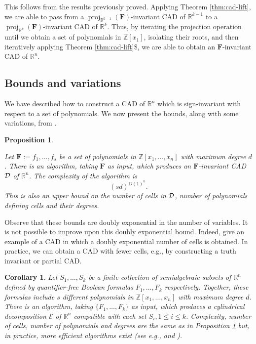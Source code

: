 \documentclass[
]{book}
\newtheorem{corollary}{Corollary}[chapter]
\newtheorem{proposition}{Proposition}[chapter]
\theoremstyle{definition}
\theoremstyle{definition}
\theoremstyle{definition}
\theoremstyle{definition}
\theoremstyle{remark}
\begin{document}
This follows from the results previously proved. Applying Theorem \ref{thm:cad-lift}, we are able to pass from a \({\operatorname{proj}_{\mathbb{R}^{k-1}}}(\mathbf{F})\)-invariant CAD of \(\mathbb{R}^{k-1}\) to a \({\operatorname{proj}_{\mathbb{R}^{k}}}(\mathbf{F})\)-invariant CAD of \(\mathbb{R}^k\). Thus, by iterating the projection operation until we obtain a set of polynomials in \(\mathbb{Z}[x_1]\), isolating their roots, and then iteratively applying Theorem \ref{thm:cad-lift}\$, we are able to obtain an \(\mathbf{F}\)-invariant CAD of \(\mathbb{R}^n\).

\hypertarget{bounds-and-variations}{%
\subsection{Bounds and variations}\label{bounds-and-variations}}

We have described how to construct a CAD of \(\mathbb{R}^n\) which is sign-invariant with respect to a set of polynomials. We now
present the bounds, along with some variations, from \citet{bpr2006}.

\begin{proposition}
\protect\hypertarget{prp:collins}{}\label{prp:collins}\citep[Algorithm 11.2]{bpr2006}

Let \(\mathbf{F} := f_1,\ldots,f_s\) be a set of polynomials in \(\mathbb{Z}[x_1, \ldots ,x_n]\) with maximum degree \(d\).
There is an algorithm, taking \(\mathbf{F}\) as input, which produces an \(\mathbf{F}\)-invariant CAD \(\cal D\) of \(\mathbb{R}^n\).
The complexity of the algorithm is
\[(sd)^{O(1)^{n}}.
\]
This is also an upper bound on the number of cells in \(\cal D\), number of polynomials defining cells and their degrees.
\end{proposition}

Observe that these bounds are doubly exponential in the number of variables. It is not possible to improve upon this doubly exponential bound.
Indeed, \citet{davenportHeintz1988} give an example of a CAD in which a doubly exponential number of cells is obtained. In practice, we can obtain a CAD with fewer cells, e.g., by constructing a truth invariant or partial CAD.

\begin{corollary}
\protect\hypertarget{cor:collins-sets}{}\label{cor:collins-sets}Let \(S_1,\ldots,S_k\) be a finite collection of semialgebraic subsets of \(\mathbb{R}^n\) defined by quantifier-free Boolean formulas \(F_1,\ldots,F_k\) respectively. Together, these formulas include \(s\) different polynomials in \(\mathbb{Z}[x_1,\ldots,x_n]\) with maximum degree \(d\).
There is an algorithm, taking \(\{F_1,\ldots,F_k\}\) as input, which produces a cylindrical decomposition \(\mathcal E\) of \(\mathbb{R}^n\) compatible with each set \(S_i, 1 \le i \le k\).
Complexity, number of cells, number of polynomials and degrees are the same as in Proposition \ref{prp:collins} but, in practice, more efficient algorithms exist (see e.g., \citet{collins1991} and \citet{bradford2014}).
\end{corollary}
\end{document}

